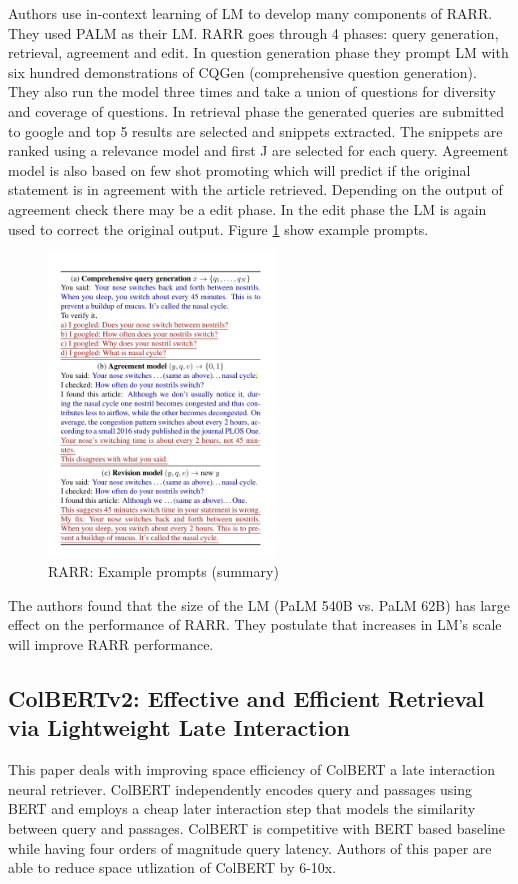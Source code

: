 \documentclass{article}
\begin{document}
Authors use in-context learning of LM to develop many components of RARR. They used PALM as their LM. RARR goes through 4 phases: query generation, retrieval, agreement and edit. In question generation phase they prompt LM with six hundred demonstrations of CQGen (comprehensive question generation). They also run the model three times and take a union of questions for diversity and coverage of questions. In retrieval phase the generated queries are submitted to google and top 5 results are selected and snippets extracted. The snippets are ranked using a relevance model and first J are selected for each query. Agreement model is also based on few shot promoting which will predict if the original statement is in agreement with the article retrieved. Depending on the output of agreement check there may be a edit phase. In the edit phase the LM is again used to correct the original output. Figure \ref{fig:RARR-prompts} show example prompts. 

\begin{figure}[htp]
    \centering
    \includegraphics[width=6cm]{RARR-prompts.png}
    \caption{RARR: Example prompts (summary) \cite{https://doi.org/10.48550/arxiv.2210.08726}}
    \label{fig:RARR-prompts}
\end{figure}

The authors found that the size of the LM (PaLM 540B vs. PaLM 62B) has large effect on the performance of RARR. They postulate that increases in LM's scale will improve RARR performance.

  \subsection{ColBERTv2: Effective and Efficient Retrieval via Lightweight Late Interaction \cite{https://doi.org/10.48550/arxiv.2112.01488}}
This paper deals with improving space efficiency of ColBERT a late interaction neural retriever. ColBERT independently encodes query and passages using BERT and employs a cheap later interaction step that models the similarity between query and passages. ColBERT is competitive with BERT based baseline while having four orders of magnitude query latency. Authors of this paper are able to reduce space utlization of ColBERT by 6-10x. 
\end{document}
